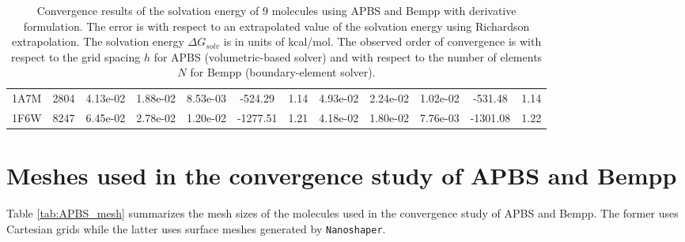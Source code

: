 {\begin{table*}[]
{\begin{tabular}{cc|ccc|cc|ccc|cc}
    1A7M & 2804 & 4.13e-02 & 1.88e-02 & 8.53e-03 & -524.29                            & 1.14                   & 4.93e-02 & 2.24e-02 & 1.02e-02 & -531.48                            & 1.14                   \\
    1F6W & 8247 & 6.45e-02 & 2.78e-02 & 1.20e-02 & -1277.51                           & 1.21                   & 4.18e-02 & 1.80e-02 & 7.76e-03 & -1301.08                           & 1.22                     
    \end{tabular}
    }
    \caption{Convergence results of the solvation energy of 9 molecules using APBS and Bempp with derivative formulation.
    The error is with respect to an extrapolated value of the solvation energy using Richardson extrapolation.
    The solvation energy $\Delta G_{solv}$ is in units of kcal/mol.
    The observed order of convergence is with respect to the grid spacing $h$ for APBS (volumetric-based solver) and with respect to the number of elements $N$ for Bempp (boundary-element solver).}
    \label{tab:APBS_result}
\end{table*}

\section{Meshes used in the convergence study of APBS and Bempp}\label{sec:apbs_mesh}
Table \ref{tab:APBS_mesh} summarizes the mesh sizes of the molecules used in the convergence study of APBS and Bempp.
The former uses Cartesian grids while the latter uses surface meshes generated by \texttt{Nanoshaper}.

}
